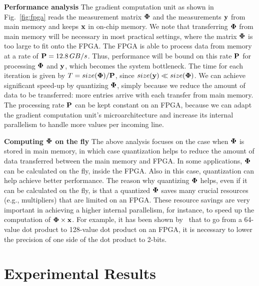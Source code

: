 \documentclass{article}
\begin{document}
{{\bf Performance analysis} The gradient computation unit as shown in Fig.~\ref{fig:fpga} reads the measurement matrix ${\bf \Phi}$ and the measurements ${\bf y}$ from main memory and keeps ${\bf x}$ in on-chip memory. 
We note that transferring ${\bf \Phi}$ from main memory will be necessary in most practical settings, where the matrix ${\bf \Phi}$ is too large to fit onto the FPGA. 
The FPGA is able to process data from memory at a rate of ${\bf P}=12.8\,GB/s$. 
Thus, performance will be bound on this rate ${\bf P}$ for processing ${\bf \Phi}$ and ${\bf y}$, which becomes the system bottleneck. The time for each iteration is given by 
$T = size({\bf \Phi})/{\bf P}$, since $size({\bf y}) \ll size({\bf \Phi})$. 
We can achieve significant speed-up by quantizing ${\bf \Phi}$, simply because we reduce the amount of data to be transferred: more entries arrive with each transfer from main memory. 
The processing rate ${\bf P}$ can be kept constant on an FPGA, because we can adapt the gradient computation unit's microarchitecture and increase its internal parallelism to handle more values per incoming line. 

{\bf Computing ${\bf \Phi}$ on the fly} The above analysis focuses on the case when ${\bf \Phi}$ 
is stored in main memory, in which case quantization helps to reduce the amount of 
data transferred between the main memory and FPGA. In some applications, ${\bf \Phi}$
can be calculated on the fly, inside the FPGA. Also in this case, quantization can help 
achieve better performance.
The reason why quantizing ${\bf \Phi}$ helps, even if it can be calculated on the fly, is
that a quantized ${\bf \Phi}$ saves many crucial resources (e.g., multipliers) that
are limited on an FPGA. These resource savings are very important in achieving a higher 
internal parallelism, for instance, to speed up the computation of ${\bf \Phi}\times{\bf x}$. 
For example, it has been shown by~\cite{kara2017fpga} that to go from a 64-value dot product to 128-value
dot product on an FPGA, it is necessary to lower the precision of one side of the dot product to 2-bits.

\section{Experimental Results}\label{section_experiments}

}
\end{document}
